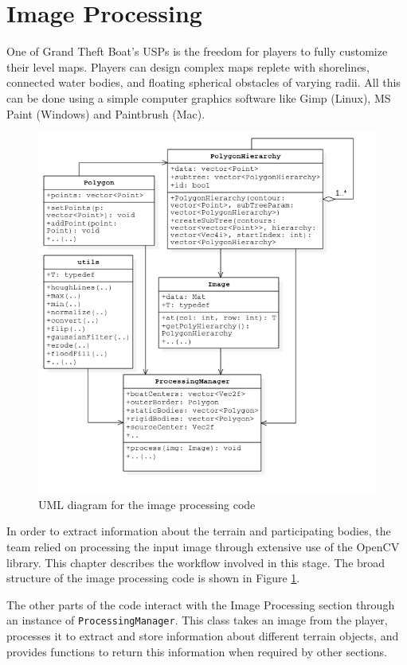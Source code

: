 \section{Image Processing}
\label{sec: imageProcessing}
One of Grand Theft Boat's USPs is the freedom for players to fully customize their level maps. Players can design complex maps replete with shorelines, connected water bodies, and floating spherical obstacles of varying radii. All this can be done using a simple computer graphics software like Gimp (Linux), MS Paint (Windows) and Paintbrush (Mac). 

\begin{figure}
\centering
  \includegraphics[scale=0.6]{img/ImageProcessing/UML_ImgProc_PNG.png}
\caption{UML diagram for the image processing code\label{fig:UMLImgProc}}
\end{figure}

In order to extract information about the terrain and participating bodies, the team relied on processing the input image through extensive use of the OpenCV library. This chapter describes the workflow involved in this stage. The broad structure of the image processing code is shown in Figure \ref{fig:UMLImgProc}.

The other parts of the code interact with the Image Processing section through an instance of \verb|ProcessingManager|. This class takes an image from the player, processes it to extract and store information about different terrain objects, and provides functions to return this information when required by other sections.

